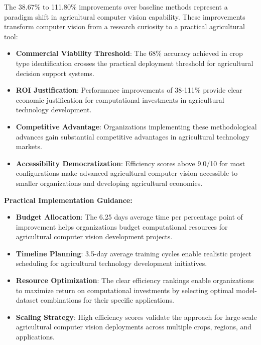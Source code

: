 The 38.67\% to 111.80\% improvements over baseline methods represent a paradigm shift in agricultural computer vision capability. These improvements transform computer vision from a research curiosity to a practical agricultural tool:

\begin{itemize}
    \item \textbf{Commercial Viability Threshold}: The 68\% accuracy achieved in crop type identification crosses the practical deployment threshold for agricultural decision support systems.
    
    \item \textbf{ROI Justification}: Performance improvements of 38-111\% provide clear economic justification for computational investments in agricultural technology development.
    
    \item \textbf{Competitive Advantage}: Organizations implementing these methodological advances gain substantial competitive advantages in agricultural technology markets.
    
    \item \textbf{Accessibility Democratization}: Efficiency scores above 9.0/10 for most configurations make advanced agricultural computer vision accessible to smaller organizations and developing agricultural economies.
\end{itemize}

\textbf{Practical Implementation Guidance:}

\begin{itemize}
    \item \textbf{Budget Allocation}: The 6.25 days average time per percentage point of improvement helps organizations budget computational resources for agricultural computer vision development projects.
    
    \item \textbf{Timeline Planning}: 3.5-day average training cycles enable realistic project scheduling for agricultural technology development initiatives.
    
    \item \textbf{Resource Optimization}: The clear efficiency rankings enable organizations to maximize return on computational investments by selecting optimal model-dataset combinations for their specific applications.
    
    \item \textbf{Scaling Strategy}: High efficiency scores validate the approach for large-scale agricultural computer vision deployments across multiple crops, regions, and applications.
\end{itemize}

